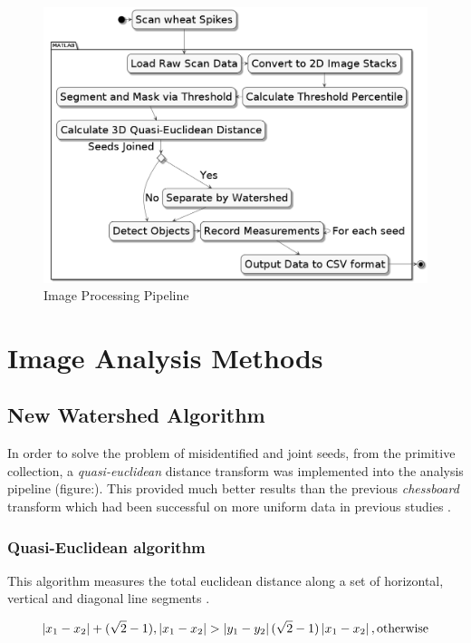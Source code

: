 \documentclass[11pt]{report}
\begin{document}
\begin{figure}[htbp]
\centering
\includegraphics[width=13cm]{./images/matlab.png}
\caption{\label{fig:org6c8c132}
Image Processing Pipeline}
\end{figure}

\section{Image Analysis Methods}
\label{sec:orgd5f0cae}
\subsection{New Watershed Algorithm}
\label{sec:org663bfed}

In order to solve the problem of misidentified and joint seeds, from the primitive collection,
a  \emph{quasi-euclidean} distance transform was implemented into the analysis pipeline (figure:). This provided much better results than the previous
\emph{chessboard} transform which had been successful on more uniform data in previous studies \cite{Hughes2017}.

\subsubsection{Quasi-Euclidean algorithm}
\label{sec:org959aa32}

This algorithm measures the total euclidean distance along a set of horizontal, vertical and diagonal
line segments \cite{Pfaltz1966}.

\begin{equation}
\label{eq:org0c697de}
\left | x_1 - x_2 \right | + (\sqrt{2}-1), \left | x_1 - x_2 \right | >\left | y_1 - y_2 \right | (\sqrt{2}-1) \left | x_1 - x_2 \right | ,\textup{otherwise}
\end{equation}
\end{document}
